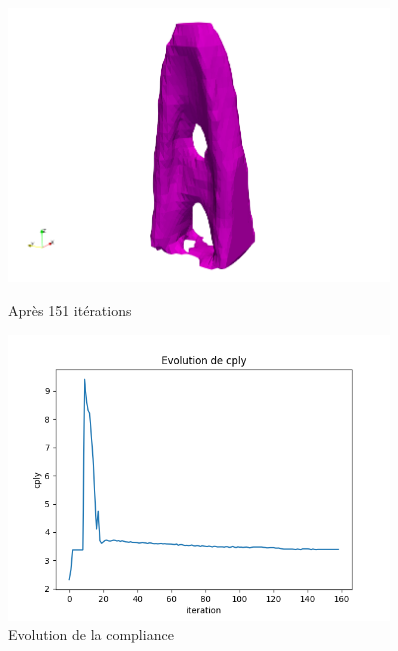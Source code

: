 \documentclass[11pt,a4paper]{article}
\begin{document}
\begin{itemize}
\begin{figure}[H]
	\begin{minipage}{0.48\textwidth}
		\includegraphics[width=0.9\textwidth]{it151lv10lc1lc5.png}
		\caption{Après 151 itérations}
	\end{minipage}	
	\begin{minipage}{0.48\textwidth}
		\includegraphics[width=0.9\textwidth]{lv10lc1lC5cply.png}
		\caption{Evolution de la compliance}
	\end{minipage}	
\end{figure}


\end{itemize}
\end{document}
